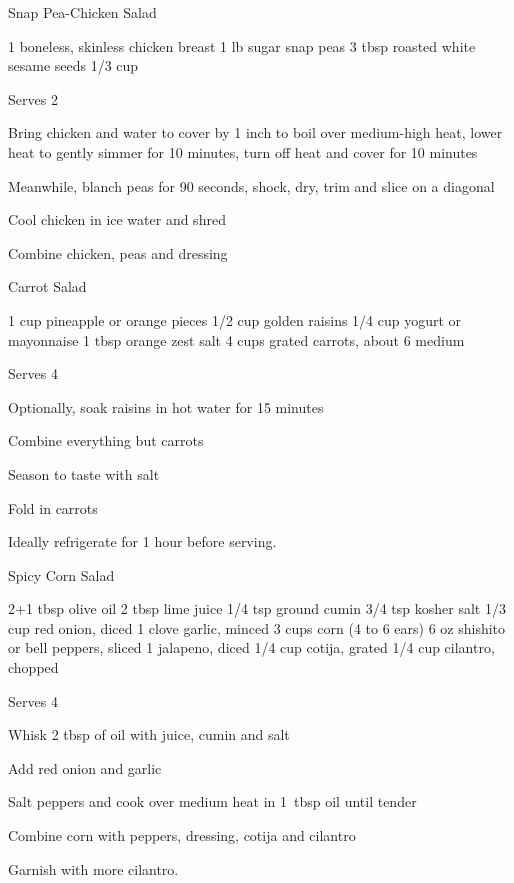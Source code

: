 \begin{recipe}{Snap Pea-Chicken Salad}{}
\begin{ingredients}
1 boneless, skinless chicken breast
1 lb sugar snap peas
3 tbsp roasted white sesame seeds
1/3 cup 
\end{ingredients}
\nextcolumn
Serves 2
\begin{steps}
    \item Bring chicken and water to cover by 1 inch to boil over medium-high heat, lower heat to gently simmer for 10 minutes, turn off heat and cover for 10 minutes
    \item Meanwhile, blanch peas for 90 seconds, shock, dry, trim and slice on a diagonal
    \item Cool chicken in ice water and shred
    \item Combine chicken, peas and dressing
\end{steps}
\end{recipe}

\begin{recipe}{Carrot Salad}{}
\begin{ingredients}
1 cup pineapple or orange pieces
1/2 cup golden raisins
1/4 cup yogurt or mayonnaise
1 tbsp orange zest
salt
4 cups grated carrots, about 6 medium
\end{ingredients}
\nextcolumn
Serves 4
\begin{steps}
    \item Optionally, soak raisins in hot water for 15 minutes
    \item Combine everything but carrots
    \item Season to taste with salt
    \item Fold in carrots
\end{steps}
Ideally refrigerate for 1 hour before serving.
\end{recipe}

\begin{denserecipe}{Spicy Corn Salad}{}
\begin{ingredients}
2+1 tbsp olive oil
2 tbsp lime juice
1/4 tsp ground cumin
3/4 tsp kosher salt
1/3 cup red onion, diced
1 clove garlic, minced
3 cups corn (4 to 6 ears)
6 oz shishito or bell peppers, sliced
1 jalapeno, diced
1/4 cup cotija, grated
1/4 cup cilantro, chopped
\end{ingredients}
\nextcolumn
Serves 4
\begin{steps}
    \item Whisk 2 tbsp of oil with juice, cumin and salt
    \item Add red onion and garlic
    \item Salt peppers and cook over medium heat in 1~tbsp oil until tender
    \item Combine corn with peppers, dressing, cotija and cilantro
\end{steps}
Garnish with more cilantro.
\end{denserecipe}

